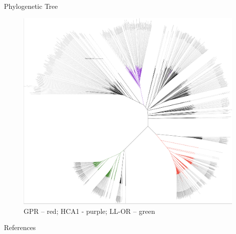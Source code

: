 \documentclass[10pt]{beamer}
\begin{document}
\begin{frame}[fragile]{Phylogenetic Tree}
\begin{figure}[H]
\centering
\includegraphics[width=0.7\linewidth]{tree.png}
\caption{GPR – red; HCA1 - purple; LL-OR – green}\label{fig:lactate_receptors}
\end{figure}
\end{frame}

\begin{frame}[allowframebreaks]{References}




\end{frame}
\end{document}
